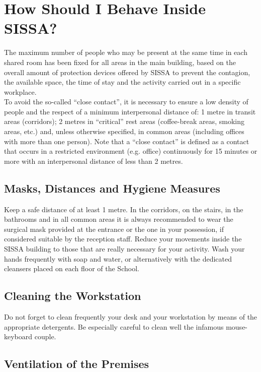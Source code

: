 \documentclass{sissavademecum}
\begin{document}
\section{How Should I Behave Inside SISSA?}

The maximum number of people who may be present at the same time in each shared room has been fixed for all areas in the main building, based on the overall amount of protection devices offered by SISSA to prevent the contagion, the available space, the time of stay and the activity carried out in a specific workplace. \\
To avoid the so-called ``close contact'', it is necessary to ensure a low density of people and the respect of a minimum interpersonal distance of: 1 metre in transit areas (corridors); 2 metres in ``critical'' rest areas (coffee-break areas, smoking areas, etc.) and, unless otherwise specified, in common areas (including offices with more than one person). Note that a ``close contact'' is defined as a contact that occurs in a restricted environment (e.g. office) continuously for 15 minutes or more with an interpersonal distance of less than 2 metres.

\subsection{Masks, Distances and Hygiene Measures}

Keep a safe distance of at least 1 metre. In the corridors, on the stairs, in the bathrooms and in all common areas it is always recommended to wear the surgical mask provided at the entrance or the one in your possession, if considered suitable by the reception staff. Reduce your movements inside the SISSA building to those that are really necessary for your activity. Wash your hands frequently with soap and water, or alternatively with the dedicated cleansers placed on each floor of the School.

\subsection{Cleaning the Workstation}

Do not forget to clean frequently your desk and your workstation by means of the appropriate detergents. Be especially careful to clean well the infamous mouse-keyboard couple.

\subsection{Ventilation of the Premises}
\end{document}

